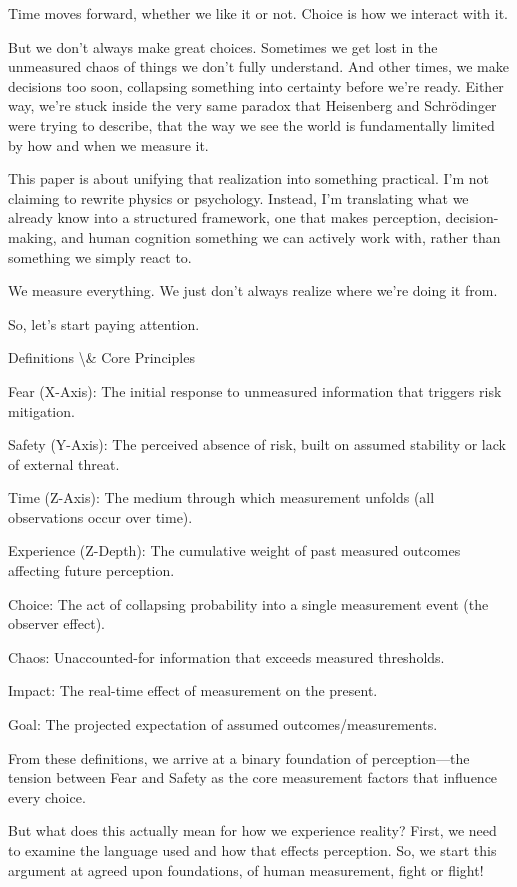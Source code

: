 \documentclass[12pt]{article}
\begin{document}
Time moves forward, whether we like it or not. Choice is how we interact with it.

But we don’t always make great choices. Sometimes we get lost in the unmeasured chaos of things we don’t fully understand. And other times, we make decisions too soon, collapsing something into certainty before we’re ready. Either way, we’re stuck inside the very same paradox that Heisenberg and Schrödinger were trying to describe, that the way we see the world is fundamentally limited by how and when we measure it.

This paper is about unifying that realization into something practical. I’m not claiming to rewrite physics or psychology. Instead, I’m translating what we already know into a structured framework, one that makes perception, decision-making, and human cognition something we can actively work with, rather than something we simply react to.

We measure everything. We just don’t always realize where we’re doing it from.

So, let’s start paying attention.

Definitions \textbackslash{}& Core Principles

Fear (X-Axis): The initial response to unmeasured information that triggers risk mitigation.

Safety (Y-Axis): The perceived absence of risk, built on assumed stability or lack of external threat.

Time (Z-Axis): The medium through which measurement unfolds (all observations occur over time).

Experience (Z-Depth): The cumulative weight of past measured outcomes affecting future perception.

Choice: The act of collapsing probability into a single measurement event (the observer effect).

Chaos: Unaccounted-for information that exceeds measured thresholds. 

Impact: The real-time effect of measurement on the present.

Goal: The projected expectation of assumed outcomes/measurements.

From these definitions, we arrive at a binary foundation of perception—the tension between Fear and Safety as the core measurement factors that influence every choice.

But what does this actually mean for how we experience reality? First, we need to examine the language used and how that effects perception. So, we start this argument at agreed upon foundations, of human measurement, fight or flight!
\end{document}
